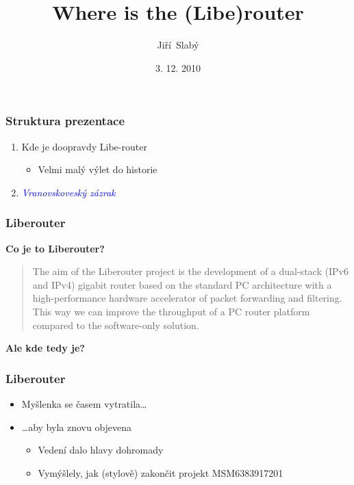\documentclass[xcolor=dvipsnames]{beamer}
\title[Libe-router] %
{Where is the (Libe)router}
\author[J. Slabý]{Jiří~Slabý}
\institute[Liberouter] %
{Liberouter, Brno}
\date{3. 12. 2010}
\let\Oldemph\emph
\renewcommand{\emph}[1]{\textcolor{blue}{\Oldemph{#1}}}
\newcommand{\heading}[1]{\textbf{\textcolor{BurntOrange}{#1}}}
\begin{document}
\begin{frame}
  \titlepage
\end{frame}


\begin{frame}
  \frametitle{Struktura prezentace}

  \begin{enumerate}
  \item Kde je doopravdy Libe-router
  \begin{itemize}
  \item Velmi malý výlet do historie
  \end{itemize}
  \item \emph{Vranovskoveský zázrak}
  \end{enumerate}

\end{frame}

\begin{frame}
  \frametitle{Liberouter}

  \heading{Co je to Liberouter?}
  \begin{quote}
The aim of the Liberouter project is the development of a dual-stack (IPv6 and
IPv4) gigabit router based on the standard PC architecture with a
high-performance hardware accelerator of packet forwarding and filtering. This
way we can improve the throughput of a PC router platform compared to the
software-only solution.
  \end{quote}

  \pause

  \begin{center}
  \heading{Ale kde tedy je?}
  \end{center}

\end{frame}

\begin{frame}
  \frametitle{Liberouter}

  \begin{itemize}
  \item Myšlenka se časem vytratila\ldots
  \pause
  \item \ldots aby byla znovu objevena
  \begin{itemize}
  \item Vedení dalo hlavy dohromady
  \item Vymýšlely, jak (stylově) zakončit projekt MSM6383917201
  \end{itemize}
  \end{itemize}

\end{frame}
\end{document}
